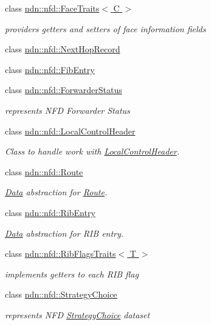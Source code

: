 \begin{DoxyCompactItemize}
class \hyperlink{classndn_1_1nfd_1_1FaceTraits}{ndn\+::nfd\+::\+Face\+Traits$<$ C $>$}
\begin{DoxyCompactList}\small\item\em providers getters and setters of face information fields \end{DoxyCompactList}\item 
class \hyperlink{classndn_1_1nfd_1_1NextHopRecord}{ndn\+::nfd\+::\+Next\+Hop\+Record}
\item 
class \hyperlink{classndn_1_1nfd_1_1FibEntry}{ndn\+::nfd\+::\+Fib\+Entry}
\item 
class \hyperlink{classndn_1_1nfd_1_1ForwarderStatus}{ndn\+::nfd\+::\+Forwarder\+Status}
\begin{DoxyCompactList}\small\item\em represents N\+FD Forwarder Status \end{DoxyCompactList}\item 
class \hyperlink{classndn_1_1nfd_1_1LocalControlHeader}{ndn\+::nfd\+::\+Local\+Control\+Header}
\begin{DoxyCompactList}\small\item\em Class to handle work with \hyperlink{classndn_1_1nfd_1_1LocalControlHeader}{Local\+Control\+Header}. \end{DoxyCompactList}\item 
class \hyperlink{classndn_1_1nfd_1_1Route}{ndn\+::nfd\+::\+Route}
\begin{DoxyCompactList}\small\item\em \hyperlink{classndn_1_1Data}{Data} abstraction for \hyperlink{classndn_1_1nfd_1_1Route}{Route}. \end{DoxyCompactList}\item 
class \hyperlink{classndn_1_1nfd_1_1RibEntry}{ndn\+::nfd\+::\+Rib\+Entry}
\begin{DoxyCompactList}\small\item\em \hyperlink{classndn_1_1Data}{Data} abstraction for R\+IB entry. \end{DoxyCompactList}\item 
class \hyperlink{classndn_1_1nfd_1_1RibFlagsTraits}{ndn\+::nfd\+::\+Rib\+Flags\+Traits$<$ T $>$}
\begin{DoxyCompactList}\small\item\em implements getters to each R\+IB flag \end{DoxyCompactList}\item 
class \hyperlink{classndn_1_1nfd_1_1StrategyChoice}{ndn\+::nfd\+::\+Strategy\+Choice}
\begin{DoxyCompactList}\small\item\em represents N\+FD \hyperlink{classndn_1_1nfd_1_1StrategyChoice}{Strategy\+Choice} dataset \end{DoxyCompactList}\end{DoxyCompactItemize}
